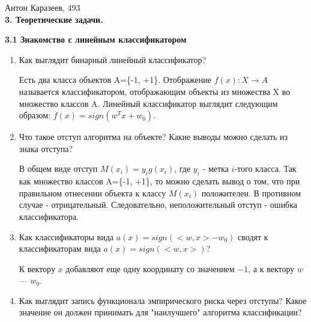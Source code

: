 \documentclass[12pt]{article}
\begin{document}
	Антон Каразеев, 493\\
	
	\textbf{3. Теоретические задачи.}
	
	\textbf{3.1 Знакомство с линейным классификатором}
	
	\begin{enumerate}
		\item Как выглядит бинарный линейный классификатор?
			
			Есть два класса объектов A=\{-1, +1\}. Отображение $f(x): X \rightarrow A$ называется классификатором, отображающим объекты из множества X во множество классов A. Линейный классификатор выглядит следующим образом: $f(x) = sign(w^Tx + w_0)$.
		
		\item Что такое отступ алгоритма на объекте? Какие выводы можно сделать из знака отступа?
			
			В общем виде отступ $M(x_i) = y_i g(x_i)$, где $y_i$ - метка $i$-того класса. Так как множество классов A=\{-1, +1\}, то можно сделать вывод о том, что при правильном отнесении объекта к классу $M(x_i)$ положителен. В противном случае - отрицательный. Следовательно, неположительный отступ - ошибка классификатора.
			
		\item Как классификаторы вида $a(x)=sign(<w,x> - w_0)$ сводят к классификаторам вида $a(x)=sign(<w,x>)$?
			
			К вектору $x$ добавляют еще одну координату со значением $-1$, а к вектору $w$ --- $w_0$.
			
		\item Как выглядит запись функционала эмпирического риска через отступы? Какое значение он должен принимать для "наилучшего" алгоритма классификации?
		
	\end{enumerate}
\end{document}

